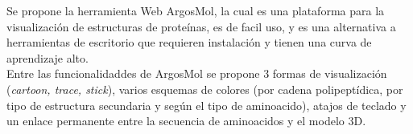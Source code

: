 \documentclass{article}
\begin{document}
Se propone la herramienta Web ArgosMol, la cual es una plataforma para la visualización de estructuras de proteínas, es de facil uso, y es una alternativa a herramientas de escritorio que requieren instalación y tienen una curva de aprendizaje alto.\\

Entre las funcionalidaddes de ArgosMol se propone 3 formas de visualización (\textit{cartoon, trace, stick}), varios esquemas de colores (por cadena polipeptídica, por tipo de estructura secundaria y según el tipo de aminoacido), atajos de teclado y un enlace permanente entre la secuencia de aminoacidos y el modelo 3D.
	
	\clearpage
	
	
	
	
	
	
	
\end{document}
